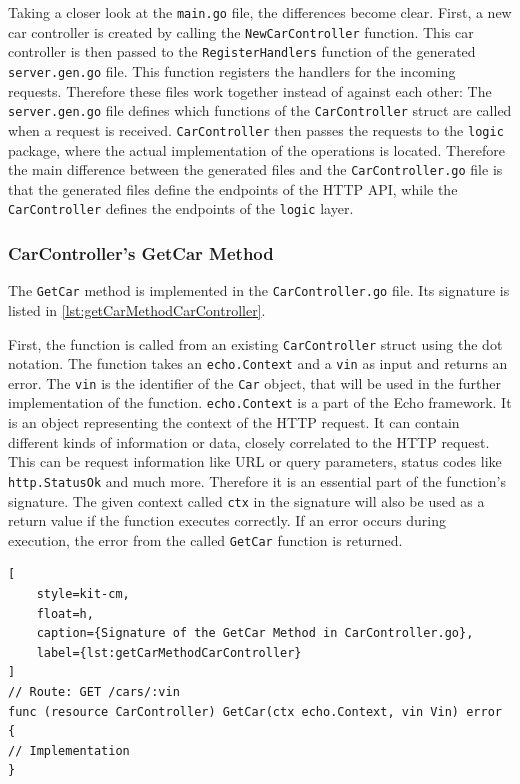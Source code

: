 Taking a closer look at the \texttt{main.go} file, the differences become clear.
First, a new car controller is created by calling the \texttt{NewCarController} function.
This car controller is then passed to the \texttt{RegisterHandlers} function of the generated \texttt{server.gen.go} file.
This function registers the handlers for the incoming requests.
Therefore these files work together instead of against each other:
The \texttt{server.gen.go} file defines which functions of the \texttt{CarController} struct are called when a request is received.
\texttt{CarController} then passes the requests to the \texttt{logic} package, where the actual implementation of the operations is located.
Therefore the main difference between the generated files and the \texttt{CarController.go} file is that the generated files define the endpoints of the HTTP API, while the \texttt{CarController} defines the endpoints of the \texttt{logic} layer.

\subsubsection*{CarController's GetCar Method}
The \texttt{GetCar} method is implemented in the \texttt{CarController.go} file.
Its signature is listed in \autoref*{lst:getCarMethodCarController}.

First, the function is called from an existing \texttt{CarController} struct using the dot notation.
The function takes an \texttt{echo.Context} and a \texttt{vin} as input and returns an error.
The \texttt{vin} is the identifier of the \texttt{Car} object, that will be used in the further implementation of the function.
\texttt{echo.Context} is a part of the Echo framework.
It is an object representing the context of the HTTP request.
It can contain different kinds of information or data, closely correlated to the HTTP request.
This can be request information like URL or query parameters, status codes like \texttt{http.StatusOk} and much more.
Therefore it is an essential part of the function's signature.
The given context called \texttt{ctx} in the signature will also be used as a return value if the function executes correctly.
If an error occurs during execution, the error from the called \texttt{GetCar} function is returned.

\begin{lstlisting}[
    style=kit-cm,
    float=h,
    caption={Signature of the GetCar Method in CarController.go},
    label={lst:getCarMethodCarController}
]
// Route: GET /cars/:vin
func (resource CarController) GetCar(ctx echo.Context, vin Vin) error {
// Implementation
}
\end{lstlisting}
